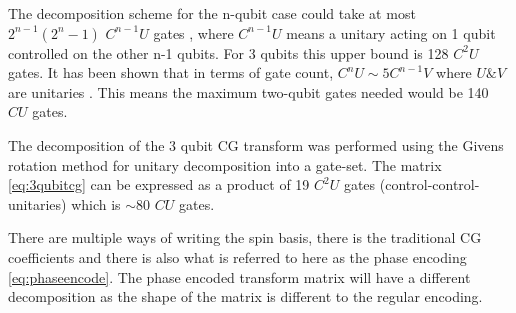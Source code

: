 The decomposition scheme for the n-qubit case could take at most $2^{n-1}(2^n-1)$ $C^{n-1}U$ gates \cite{li2013decomposition}, where $C^{n-1}U$ means a unitary acting on 1 qubit controlled on the other n-1 qubits. For 3 qubits this upper bound is 128 $C^2U$ gates. It has been shown that in terms of gate count, $C^nU \sim 5 C^{n-1}V$ where $U \& V$ are unitaries \cite{barenco1995elementary}. This means the maximum two-qubit gates needed would be 140 $CU$ gates.

The decomposition of the 3 qubit CG transform was performed using the Givens rotation method for unitary decomposition into a gate-set. The matrix \autoref{eq:3qubitcg} can be expressed as a product of 19 $C^2U$ gates (control-control-unitaries) which is $\sim$80 $CU$ gates. 

There are multiple ways of writing the spin basis, there is the traditional CG coefficients and there is also what is referred to here as the phase encoding \autoref{eq:phaseencode}. The phase encoded transform matrix will have a different decomposition as the shape of the matrix is different to the regular encoding. 


\begin{comment}
\begin{table}[h]
\centering
\begin{tabular}{ |c | c| } 
\hline
$J=\frac{3}{2}$ (P=000 j=1/2, j=1, j=3/2) &$S=\frac{3}{2}$ \\
\hline  
 $000$ &$M=\frac{3}{2}$ \\
 $\sqrt{\frac{1}{3}}(001+010+100)$  &$M=\frac{1}{2}$ \\ 
 $\sqrt{\frac{1}{3}}(110+011+101)$  &$M=-\frac{1}{2}$ \\
 $111$ &$M=-\frac{3}{2}$ \\
\hline
$J=\frac{1}{2}$ (P=001 j=1/2, j=1, j=1/2) &$S=\frac{1}{2}$ \\
\hline
 $\sqrt{\frac{2}{3}}(001) - \sqrt{\frac{1}{6}}(010+100)$  &$M=\frac{1}{2}$ \\ 
 $-\sqrt{\frac{2}{3}}(110) + \sqrt{\frac{1}{6}}(011+101)$  &$M=-\frac{1}{2}$ \\ 
\hline 
$J=\frac{1}{2}$ (P=010 j=1/2, j=0, j=1/2) &$S=\frac{1}{2}$ \\
\hline
 $\frac{1}{\rtwo} (010-100)$ &$M=\frac{1}{2}$\\
 $\frac{1}{\rtwo} (011-101)$ &$M=-\frac{1}{2}$ \\ 
\hline 
\end{tabular}
\caption{J \& M values for 3 qubits using encoding 0=spin up, 1=spin down}
\label{fig:tab1}
\end{table}
\end{comment}



